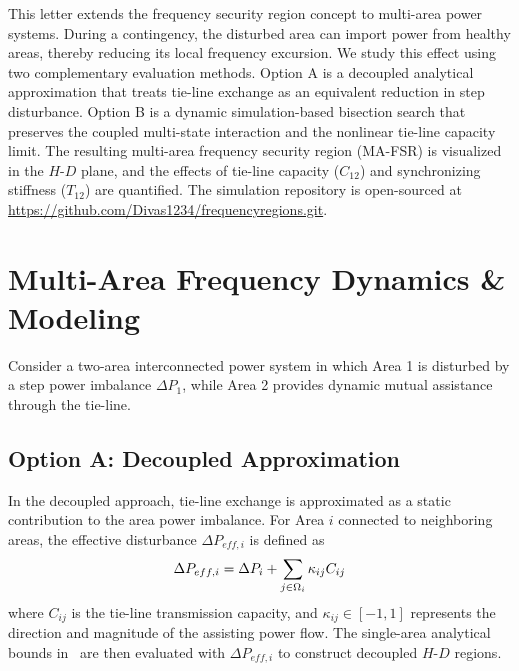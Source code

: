 \documentclass[lettersize,journal]{IEEEtran}
\begin{document}
This letter extends the frequency security region concept to multi-area power systems. During a contingency, the disturbed area can import power from healthy areas, thereby reducing its local frequency excursion. We study this effect using two complementary evaluation methods. Option A is a decoupled analytical approximation that treats tie-line exchange as an equivalent reduction in step disturbance. Option B is a dynamic simulation-based bisection search that preserves the coupled multi-state interaction and the nonlinear tie-line capacity limit. The resulting multi-area frequency security region (MA-FSR) is visualized in the $H$-$D$ plane, and the effects of tie-line capacity ($C_{12}$) and synchronizing stiffness ($T_{12}$) are quantified. The simulation repository is open-sourced at \url{https://github.com/Divas1234/frequencyregions.git}.

\vspace{-0.25cm}
\section{Multi-Area Frequency Dynamics \& Modeling}

Consider a two-area interconnected power system in which Area 1 is disturbed by a step power imbalance $\Delta P_1$, while Area 2 provides dynamic mutual assistance through the tie-line.

\subsection{Option A: Decoupled Approximation}
In the decoupled approach, tie-line exchange is approximated as a static contribution to the area power imbalance. For Area $i$ connected to neighboring areas, the effective disturbance $\Delta P_{eff,i}$ is defined as
\vspace{-0.15cm}
\begin{equation}
\Delta P_{eff,i} = \Delta P_i + \sum_{j \in \Omega_i} \kappa_{ij} C_{ij}
\vspace{-0.15cm}
\end{equation}
where $C_{ij}$ is the tie-line transmission capacity, and $\kappa_{ij} \in [-1, 1]$ represents the direction and magnitude of the assisting power flow. The single-area analytical bounds in~\cite{manuscript} are then evaluated with $\Delta P_{eff,i}$ to construct decoupled $H$-$D$ regions.
\end{document}
